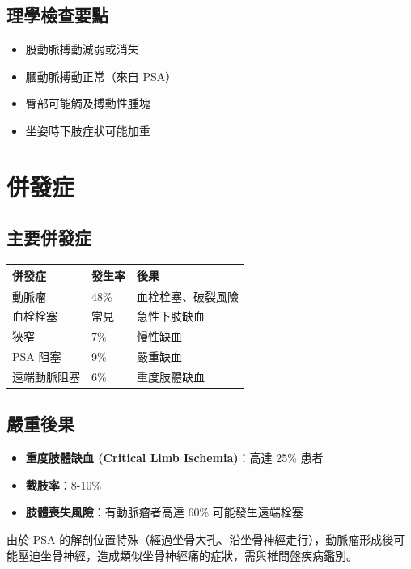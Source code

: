 \documentclass[12pt,a4paper]{article}
\newcommand{\note}[1]{
    \par
    \noindent
    \begin{tcolorbox}[
        colback=emergency_blue!5!white,
        colframe=emergency_blue,
        title=\textbf{重點提醒},
        fonttitle=\bfseries,
        boxrule=0.5pt,
        arc=3pt,
        left=6pt,
        right=6pt,
        top=6pt,
        bottom=6pt
    ]
    #1
    \end{tcolorbox}
}
\begin{document}
\subsection{理學檢查要點}

\begin{itemize}
    \item 股動脈搏動減弱或消失
    \item 膕動脈搏動正常（來自 PSA）
    \item 臀部可能觸及搏動性腫塊
    \item 坐姿時下肢症狀可能加重
\end{itemize}

\section{併發症}

\subsection{主要併發症}

\begin{longtable}{p{4cm}p{3cm}p{7cm}}
\toprule
\textbf{併發症} & \textbf{發生率} & \textbf{後果} \\
\midrule
\endfirsthead
\bottomrule
\endlastfoot
動脈瘤 & 48\% & 血栓栓塞、破裂風險 \\
\midrule
血栓栓塞 & 常見 & 急性下肢缺血 \\
\midrule
狹窄 & 7\% & 慢性缺血 \\
\midrule
PSA 阻塞 & 9\% & 嚴重缺血 \\
\midrule
遠端動脈阻塞 & 6\% & 重度肢體缺血 \\
\end{longtable}

\subsection{嚴重後果}

\begin{itemize}
    \item \textbf{重度肢體缺血 (Critical Limb Ischemia)}：高達 25\% 患者
    \item \textbf{截肢率}：8-10\%
    \item \textbf{肢體喪失風險}：有動脈瘤者高達 60\% 可能發生遠端栓塞
\end{itemize}

\note{
由於 PSA 的解剖位置特殊（經過坐骨大孔、沿坐骨神經走行），動脈瘤形成後可能壓迫坐骨神經，造成類似坐骨神經痛的症狀，需與椎間盤疾病鑑別。
}
\end{document}
